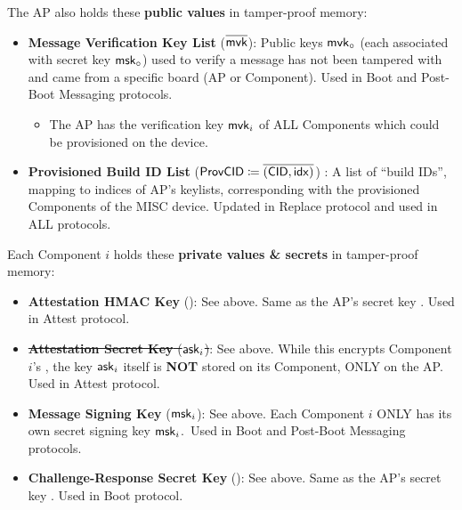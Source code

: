 \vspace{1em}
The AP also holds these \textbf{public values} in tamper-proof memory:
\begin{itemize}
    \item \textbf{Message Verification Key List} ($\overline{\mathsf{mvk}}$): Public keys $\mathsf{mvk}_\circ$ (each associated with secret key $\mathsf{msk}_\circ$) used to verify a message has not been tampered with and came from a specific board (AP or Component). Used in Boot and Post-Boot Messaging protocols.
    \iflong
    \begin{itemize}
        \item The AP has the verification key $\mathsf{mvk}_i$ of ALL Components which could be provisioned on the device.
    \end{itemize}
    \fi
    \item \textbf{Provisioned Build ID List} ($\mathsf{ProvCID} \coloneqq \overline{(\mathsf{CID}, \mathsf{idx})}$) : A list of ``build IDs'', mapping \cid to indices \buildid of AP's keylists, corresponding with the provisioned Components of the MISC device. Updated in Replace protocol and used in ALL protocols.
\end{itemize}

\vspace{1em}
Each Component $i$ holds these \textbf{private values \& secrets} in tamper-proof memory:
\begin{itemize}
    \item \textbf{Attestation HMAC Key} (\hsk): See above. Same as the AP's secret key \hsk. Used in Attest protocol.
    \iflong\item \st{\textbf{Attestation Secret Key} ($\mathsf{ask}_i$)}: See above. While this encrypts Component $i$'s \adata, the key $\mathsf{ask}_i$ itself is \textbf{NOT} stored on its Component, ONLY on the AP. Used in Attest protocol.\fi
    \item \textbf{Message Signing Key} ($\mathsf{msk}_i$): See above. \iflong Each Component $i$ ONLY has its own secret signing key $\mathsf{msk}_i$.~\fi Used in Boot and Post-Boot Messaging protocols.
    \item \textbf{Challenge-Response Secret Key} (\csk): See above. Same as the AP's secret key \csk. Used in Boot protocol.
\end{itemize}

